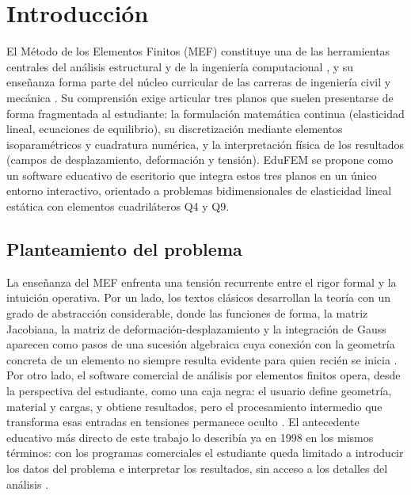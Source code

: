 \chapter*{Introducción}

El Método de los Elementos Finitos (MEF) constituye una de las herramientas centrales del análisis estructural y de la ingeniería computacional \autocite{zienkiewicz2013fem,cook2002concepts}, y su enseñanza forma parte del núcleo curricular de las carreras de ingeniería civil y mecánica \autocite[p.~1160]{perezsantiago2023fem}. Su comprensión exige articular tres planos que suelen presentarse de forma fragmentada al estudiante: la formulación matemática continua (elasticidad lineal, ecuaciones de equilibrio), su discretización mediante elementos isoparamétricos y cuadratura numérica, y la interpretación física de los resultados (campos de desplazamiento, deformación y tensión). EduFEM se propone como un software educativo de escritorio que integra estos tres planos en un único entorno interactivo, orientado a problemas bidimensionales de elasticidad lineal estática con elementos cuadriláteros Q4 y Q9.

\section*{Planteamiento del problema}

La enseñanza del MEF enfrenta una tensión recurrente entre el rigor formal y la intuición operativa. Por un lado, los textos clásicos desarrollan la teoría con un grado de abstracción considerable, donde las funciones de forma, la matriz Jacobiana, la matriz de deformación-desplazamiento y la integración de Gauss aparecen como pasos de una sucesión algebraica cuya conexión con la geometría concreta de un elemento no siempre resulta evidente para quien recién se inicia \autocite{bathe2014fem,reddy2006introduction}. Por otro lado, el software comercial de análisis por elementos finitos opera, desde la perspectiva del estudiante, como una caja negra: el usuario define geometría, material y cargas, y obtiene resultados, pero el procesamiento intermedio que transforma esas entradas en tensiones permanece oculto \autocite[p.~1160]{perezsantiago2023fem}. El antecedente educativo más directo de este trabajo lo describía ya en 1998 en los mismos términos: con los programas comerciales el estudiante queda limitado a introducir los datos del problema e interpretar los resultados, sin acceso a los detalles del análisis \autocite[p.~246]{suarez1998edelas2d}.

